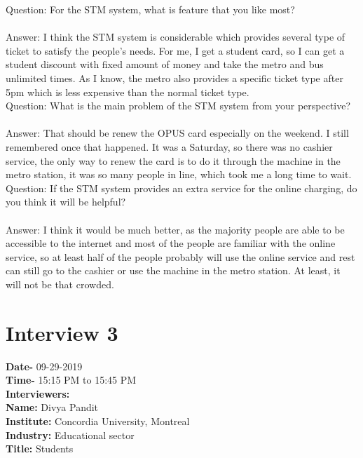 \documentclass[11pt, english]{report}
\begin{document}
Question: For the STM system, what is feature that you like most?\\\\
Answer: I think the STM system is considerable which provides several type of ticket to satisfy the people's needs. For me, I get a student card, so I can get a student discount with fixed amount of money and take the metro and bus unlimited times. As I know, the metro also provides a specific ticket type after 5pm which is less expensive than the normal ticket type.\\


Question: What is the main problem of the STM system from your perspective?\\\\
Answer: That should be renew the OPUS card especially on the weekend. I still remembered once that happened. It was a Saturday, so there was no cashier service, the only way to renew the card is to do it through the machine in the metro station, it was so many people in line, which took me a long time to wait.\\

Question: If the STM system provides an extra service for the online charging, do you think it will be helpful?\\\\
Answer: I think it would be much better, as the majority people are able to be accessible to the internet and most of the people are familiar with the online service, so at least half of the people probably will use the online service and rest can still go to the cashier or use the machine in the metro station. At least, it will not be that crowded.\\



\section{Interview 3}
\textbf{Date-} 09-29-2019\\
\textbf{Time-} 15:15 PM to 15:45 PM\\
\textbf{Interviewers:}\\

\textbf{Name:} Divya Pandit \\
\textbf{Institute:} Concordia University, Montreal \\
\textbf{Industry:} Educational sector\\
\textbf{Title:} Students \\ 
\end{document}
